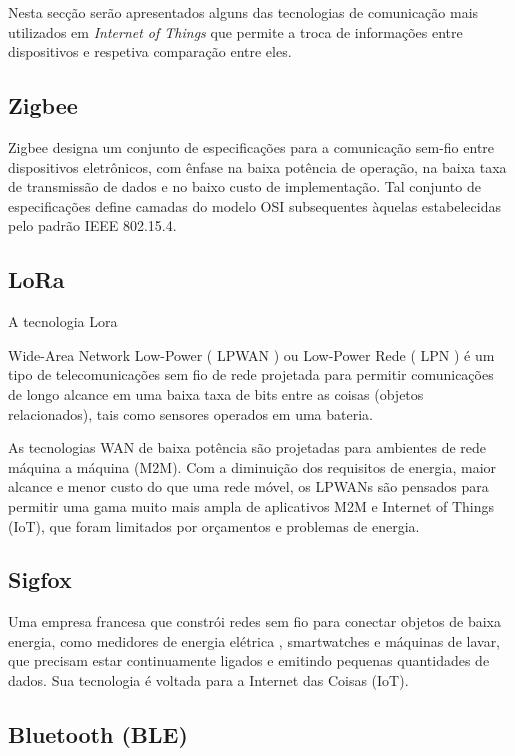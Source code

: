 Nesta secção serão apresentados alguns das tecnologias de comunicação mais utilizados em \textit{Internet of Things} que permite a troca de informações entre dispositivos e respetiva comparação entre eles. 




\subsection{Zigbee}

Zigbee designa um conjunto de especificações para a comunicação sem-fio entre dispositivos eletrônicos, com ênfase na baixa potência de operação, na baixa taxa de transmissão de dados e no baixo custo de implementação. Tal conjunto de especificações define camadas do modelo OSI subsequentes àquelas estabelecidas pelo padrão IEEE 802.15.4.


\subsection{LoRa}

A tecnologia Lora

Wide-Area Network Low-Power ( LPWAN ) ou Low-Power Rede ( LPN ) é um tipo de telecomunicações sem fio de rede projetada para permitir comunicações de longo alcance em uma baixa taxa de bits entre as coisas (objetos relacionados), tais como sensores operados em uma bateria.

As tecnologias WAN de baixa potência são projetadas para ambientes de rede máquina a máquina (M2M). Com a diminuição dos requisitos de energia, maior alcance e menor custo do que uma rede móvel, os LPWANs são pensados para permitir uma gama muito mais ampla de aplicativos M2M e Internet of Things (IoT), que foram limitados por orçamentos e problemas de energia.



\subsection{Sigfox}

Uma empresa francesa que constrói redes sem fio para conectar objetos de baixa energia, como medidores de energia elétrica , smartwatches e máquinas de lavar, que precisam estar continuamente ligados e emitindo pequenas quantidades de dados. Sua tecnologia é voltada para a Internet das Coisas (IoT).



\subsection{Bluetooth (BLE)}

